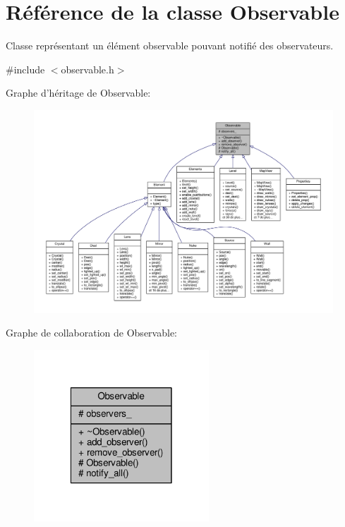 \hypertarget{classObservable}{\section{Référence de la classe Observable}
\label{classObservable}
}


Classe représentant un élément observable pouvant notifié des observateurs.  




{\ttfamily \#include $<$observable.\+h$>$}



Graphe d'héritage de Observable\+:\nopagebreak
\begin{figure}[H]
\begin{center}
\leavevmode
\includegraphics[width=350pt]{d7/d7e/classObservable__inherit__graph}
\end{center}
\end{figure}


Graphe de collaboration de Observable\+:\nopagebreak
\begin{figure}[H]
\begin{center}
\leavevmode
\includegraphics[width=186pt]{df/da6/classObservable__coll__graph}
\end{center}
\end{figure}
